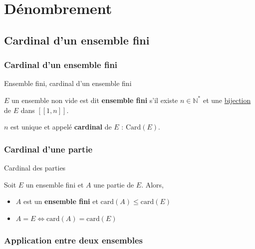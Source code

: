 \chapter{Dénombrement} %
\label{chap:Dénombrement}

\section{Cardinal d'un ensemble fini} %
\label{sec:Cardinal d'un ensemble fini}

\subsection{Cardinal d'un ensemble fini} %
\label{sub:Cardinal d'un ensemble fini}

\begin{Definition}[colbacktitle=red!75!black]{
    Ensemble fini, cardinal d'un ensemble fini
  }{}

  $E$ un ensemble non vide est dit \textbf{ensemble fini} s'il existe $n \in \mathbb{N} ^{*}$ et une \underline{bijection} de $E$ dans $[\![1, n]\!]$. 

  $n$ est unique et appelé \textbf{cardinal} de $E$ : $\boxed{\mathrm{Card}(E)}$.

\end{Definition}


\subsection{Cardinal d'une partie} %
\label{sub:Cardinal d'une partie}

\begin{Theorem}{Cardinal des parties}{}

Soit $E$ un ensemble fini et $A$ une partie de $E$. Alors, 
\begin{itemize}

    \item $A$ est un \textbf{ensemble fini} et $\mathrm{card}(A) \le \mathrm{card}(E)$ 
    \item $A =E \iff \mathrm{card}(A) = \mathrm{card}(E)$

\end{itemize}
\end{Theorem}



\subsection{Application entre deux ensembles} %
\label{sub:Application entre deux ensembles}

